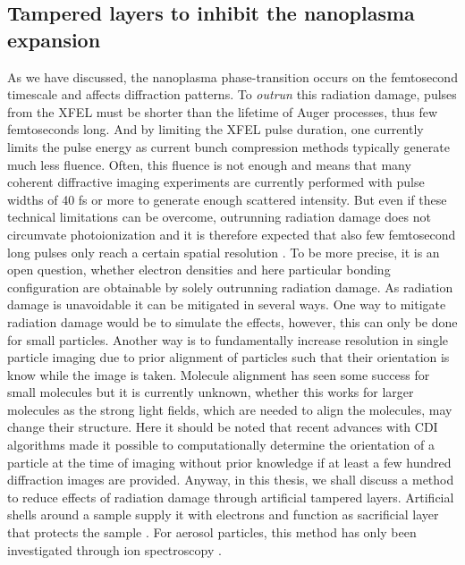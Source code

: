 \subsection{Tampered layers to inhibit the nanoplasma expansion}
%
%
As we have discussed, the nanoplasma phase-transition occurs on the femtosecond timescale and affects diffraction patterns. To \textit{outrun} this radiation damage, pulses from the XFEL must be shorter than the lifetime of Auger processes, thus few femtoseconds long. And by limiting the XFEL pulse duration, one currently limits the pulse energy as current bunch compression methods typically generate much less fluence. Often, this fluence is not enough and means that many coherent diffractive imaging experiments are currently performed with pulse widths of 40 fs or more to generate enough scattered intensity. But even if these technical limitations can be overcome, outrunning radiation damage does not circumvate photoionization and it is therefore expected that also few femtosecond long pulses only reach a certain spatial resolution \citep{Aquila-2015-StrucDyn}. To be more precise, it is an open question, whether electron densities and here particular bonding configuration are obtainable by solely outrunning radiation damage. As radiation damage is unavoidable it can be mitigated in several ways. One way to mitigate radiation damage would be to simulate the effects, however, this can only be done for small particles. Another way is to fundamentally increase resolution in single particle imaging due to prior alignment of particles such that their orientation is know while the image is taken. Molecule alignment has seen some success for small molecules \citep{Kupper-2014-PRL} but it is currently unknown, whether this works for larger molecules as the strong light fields, which are needed to align the molecules, may change their structure. Here it should be noted that recent advances with CDI algorithms made it possible to computationally determine the orientation of a particle at the time of imaging \citep{Loh-2009-PRE,Ekeberg-2015-PRL} without prior knowledge if at least a few hundred diffraction images are provided. Anyway, in this thesis, we shall discuss a method to reduce effects of radiation damage through artificial tampered layers. Artificial shells around a sample supply it with electrons and function as sacrificial layer that protects the sample \citep{Hau-Riege-2010-PRL}. For aerosol particles, this method has only been investigated through ion spectroscopy \citep{Hoener-2008-JPB,Ziemkewitz-2017-unpublished}.
